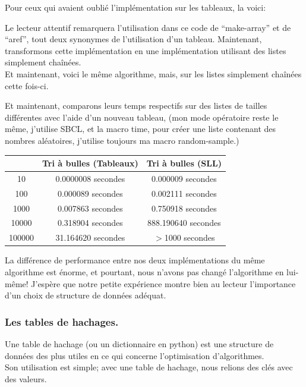 \documentclass[a4paper, 12pt]{article}
\numberwithin{equation}{subsection}
\begin{document}
Pour ceux qui avaient oublié l'implémentation sur les tableaux, la voici:

Le lecteur attentif remarquera l'utilisation dans ce code de ``make-array'' et de ``aref'', tout deux synonymes de l'utilisation d'un tableau. Maintenant, transformons cette implémentation en une implémentation utilisant des listes simplement chaînées. \\
Et maintenant, voici le même algorithme, mais, sur les listes simplement chaînées cette fois-ci.

Et maintenant, comparons leurs temps respectifs sur des listes de tailles différentes avec l'aide d'un nouveau tableau, (mon mode opératoire reste le même, j'utilise SBCL, et la macro time, pour créer une liste contenant des nombres aléatoires, j'utilise toujours ma macro random-sample.)
\begin{table}[H]
  \centering
  \begin{tabular}{|c|c|c|}
    \hline & Tri à bulles (Tableaux) & Tri à bulles (SLL) \\
    \hline 10 &  0.0000008 secondes &  0.000009 secondes \\
    \hline 100 &  0.000089 secondes &  0.002111 secondes \\
    \hline 1000 & 0.007863 secondes &  0.750918 secondes \\
    \hline 10000 & 0.318904 secondes & 888.190640 secondes \\
    \hline 100000 &  31.164620 secondes & $>$1000 secondes \\
    \hline
  \end{tabular}
\end{table}
La différence de performance entre nos deux implémentations du même algorithme est énorme, et pourtant, nous n'avons pas changé l'algorithme en lui-même! J'espère que notre petite expérience montre bien au lecteur l'importance d'un choix de structure de données adéquat.
\subsubsection{Les tables de hachages.}
Une table de hachage (ou un dictionnaire en python) est une structure de données des plus utiles en ce qui concerne l'optimisation d'algorithmes. \\

Son utilisation est simple; avec une table de hachage, nous relions des clés avec des valeurs. \\
\end{document}
